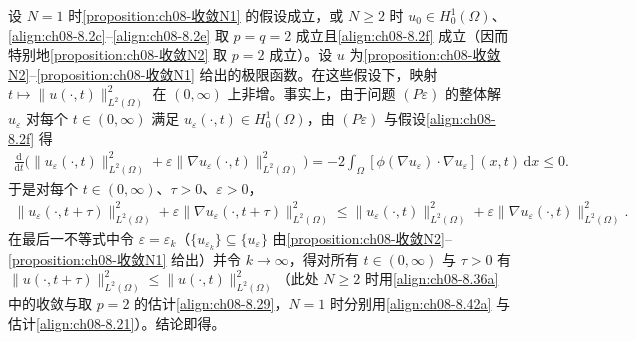 \documentclass[../../main.tex]{subfiles}%
\begin{document}
\begin{remark}\label{remark:ch08-能量衰减}
设 $N=1$ 时\cref{proposition:ch08-收敛N1} 的假设成立，或 $N\geqslant2$ 时 $u_0\in H^1_0(\Omega)$、\eqref{align:ch08-8.2c}--\eqref{align:ch08-8.2e} 取 $p=q=2$ 成立且\eqref{align:ch08-8.2f} 成立（因而特别地\cref{proposition:ch08-收敛N2} 取 $p=2$ 成立）。设 $u$ 为\cref{proposition:ch08-收敛N2}--\cref{proposition:ch08-收敛N1} 给出的极限函数。在这些假设下，映射 $t\mapsto\|u(\cdot,t)\|^2_{L^2(\Omega)}$ 在 $(0,\infty)$ 上非增。事实上，由于问题 $(P\varepsilon)$ 的整体解 $u_\varepsilon$ 对每个 $t\in(0,\infty)$ 满足 $u_\varepsilon(\cdot,t)\in H^1_0(\Omega)$，由 $(P\varepsilon)$ 与假设\eqref{align:ch08-8.2f} 得
\begin{align*}
\frac{\mathrm{d}}{\mathrm{d}t}\Big(\|u_\varepsilon(\cdot,t)\|^2_{L^2(\Omega)}+\varepsilon\|\nabla u_\varepsilon(\cdot,t)\|^2_{L^2(\Omega)}\Big)
=-2\int_\Omega[\phi(\nabla u_\varepsilon)\cdot\nabla u_\varepsilon](x,t)\,\mathrm{d}x\leqslant0.
\end{align*}
于是对每个 $t\in(0,\infty)$、$\tau>0$、$\varepsilon>0$，
\begin{align}
\|u_\varepsilon(\cdot,t+\tau)\|^2_{L^2(\Omega)}+\varepsilon\|\nabla u_\varepsilon(\cdot,t+\tau)\|^2_{L^2(\Omega)}
\leqslant\|u_\varepsilon(\cdot,t)\|^2_{L^2(\Omega)}+\varepsilon\|\nabla u_\varepsilon(\cdot,t)\|^2_{L^2(\Omega)}. \label{align:ch08-8.47}
\end{align}
在最后一不等式中令 $\varepsilon=\varepsilon_k$（$\{u_{\varepsilon_k}\}\subseteq\{u_\varepsilon\}$ 由\cref{proposition:ch08-收敛N2}--\cref{proposition:ch08-收敛N1} 给出）并令 $k\to\infty$，得对所有 $t\in(0,\infty)$ 与 $\tau>0$ 有 $\|u(\cdot,t+\tau)\|^2_{L^2(\Omega)}\leqslant\|u(\cdot,t)\|^2_{L^2(\Omega)}$（此处 $N\geqslant2$ 时用\eqref{align:ch08-8.36a} 中的收敛与取 $p=2$ 的估计\eqref{align:ch08-8.29}，$N=1$ 时分别用\eqref{align:ch08-8.42a} 与估计\eqref{align:ch08-8.21}）。结论即得。
\end{remark}
\end{document}
